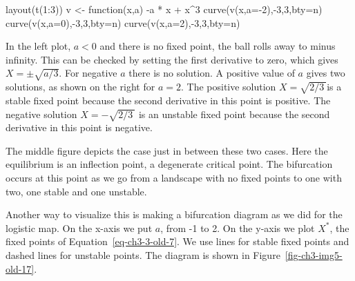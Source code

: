 \documentclass[
  a4paper,
  DIV=11,
  numbers=noendperiod]{scrreprt}
\newenvironment{Shaded}{\begin{snugshade}}{\end{snugshade}}
\newcommand{\AttributeTok}[1]{\textcolor[rgb]{0.40,0.45,0.13}{#1}}
\newcommand{\ControlFlowTok}[1]{\textcolor[rgb]{0.00,0.23,0.31}{#1}}
\newcommand{\DecValTok}[1]{\textcolor[rgb]{0.68,0.00,0.00}{#1}}
\newcommand{\FunctionTok}[1]{\textcolor[rgb]{0.28,0.35,0.67}{#1}}
\newcommand{\NormalTok}[1]{\textcolor[rgb]{0.00,0.23,0.31}{#1}}
\newcommand{\OtherTok}[1]{\textcolor[rgb]{0.00,0.23,0.31}{#1}}
\newcommand{\SpecialCharTok}[1]{\textcolor[rgb]{0.37,0.37,0.37}{#1}}
\newcommand{\StringTok}[1]{\textcolor[rgb]{0.13,0.47,0.30}{#1}}
\begin{document}
\begin{Shaded}
\begin{Highlighting}[]
\FunctionTok{layout}\NormalTok{(}\FunctionTok{t}\NormalTok{(}\DecValTok{1}\SpecialCharTok{:}\DecValTok{3}\NormalTok{))}
\NormalTok{v }\OtherTok{\textless{}{-}} \ControlFlowTok{function}\NormalTok{(x,a) }\SpecialCharTok{{-}}\NormalTok{a }\SpecialCharTok{*}\NormalTok{ x }\SpecialCharTok{+}\NormalTok{ x}\SpecialCharTok{\^{}}\DecValTok{3} 
\FunctionTok{curve}\NormalTok{(}\FunctionTok{v}\NormalTok{(x,}\AttributeTok{a=}\SpecialCharTok{{-}}\DecValTok{2}\NormalTok{),}\SpecialCharTok{{-}}\DecValTok{3}\NormalTok{,}\DecValTok{3}\NormalTok{,}\AttributeTok{bty=}\StringTok{\textquotesingle{}n\textquotesingle{}}\NormalTok{)}
\FunctionTok{curve}\NormalTok{(}\FunctionTok{v}\NormalTok{(x,}\AttributeTok{a=}\DecValTok{0}\NormalTok{),}\SpecialCharTok{{-}}\DecValTok{3}\NormalTok{,}\DecValTok{3}\NormalTok{,}\AttributeTok{bty=}\StringTok{\textquotesingle{}n\textquotesingle{}}\NormalTok{)}
\FunctionTok{curve}\NormalTok{(}\FunctionTok{v}\NormalTok{(x,}\AttributeTok{a=}\DecValTok{2}\NormalTok{),}\SpecialCharTok{{-}}\DecValTok{3}\NormalTok{,}\DecValTok{3}\NormalTok{,}\AttributeTok{bty=}\StringTok{\textquotesingle{}n\textquotesingle{}}\NormalTok{)}
\end{Highlighting}
\end{Shaded}

In the left plot, \(a < 0\) and there is no fixed point, the ball rolls
away to minus infinity. This can be checked by setting the first
derivative to zero, which gives \(X = \pm \sqrt{{a}/{3}}\). For negative
\(a\) there is no solution. A positive value of \(a\) gives two
solutions, as shown on the right for \(a = 2\). The positive solution
\(X = \sqrt{{2}/{3}\ }\)is a stable fixed point because the second
derivative in this point is positive. The negative solution
\(X = - \sqrt{{2}/{3}\ }\) is an unstable fixed point because the second
derivative in this point is negative.

The middle figure depicts the case just in between these two cases. Here
the equilibrium is an inflection point, a degenerate critical point. The
bifurcation occurs at this point as we go from a landscape with no fixed
points to one with two, one stable and one unstable.

Another way to visualize this is making a bifurcation diagram as we did
for the logistic map. On the x-axis we put \(a\), from -1 to 2. On the
y-axis we plot \(X^{*}\), the fixed points of
Equation~\ref{eq-ch3-3-old-7}. We use lines for stable fixed points and
dashed lines for unstable points. The diagram is shown in
Figure~\ref{fig-ch3-img5-old-17}.
\end{document}

